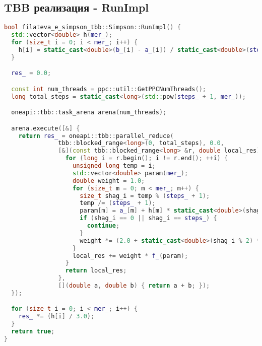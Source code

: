 \documentclass[12pt]{article}
\begin{document}
\subsection{TBB реализация - RunImpl}
\begin{lstlisting}[language=C++]
bool filateva_e_simpson_tbb::Simpson::RunImpl() {
  std::vector<double> h(mer_);
  for (size_t i = 0; i < mer_; i++) {
    h[i] = static_cast<double>(b_[i] - a_[i]) / static_cast<double>(steps_);
  }

  res_ = 0.0;

  const int num_threads = ppc::util::GetPPCNumThreads();
  long total_steps = static_cast<long>(std::pow(steps_ + 1, mer_));

  oneapi::tbb::task_arena arena(num_threads);

  arena.execute([&] {
    return res_ = oneapi::tbb::parallel_reduce(
               tbb::blocked_range<long>(0, total_steps), 0.0,
               [&](const tbb::blocked_range<long> &r, double local_res) {
                 for (long i = r.begin(); i != r.end(); ++i) {
                   unsigned long temp = i;
                   std::vector<double> param(mer_);
                   double weight = 1.0;
                   for (size_t m = 0; m < mer_; m++) {
                     size_t shag_i = temp % (steps_ + 1);
                     temp /= (steps_ + 1);
                     param[m] = a_[m] + h[m] * static_cast<double>(shag_i);
                     if (shag_i == 0 || shag_i == steps_) {
                       continue;
                     }
                     weight *= (2.0 + static_cast<double>(shag_i % 2) * 2);
                   }
                   local_res += weight * f_(param);
                 }
                 return local_res;
               },
               [](double a, double b) { return a + b; });
  });

  for (size_t i = 0; i < mer_; i++) {
    res_ *= (h[i] / 3.0);
  }
  return true;
}
\end{lstlisting}
\newpage
\end{document}
